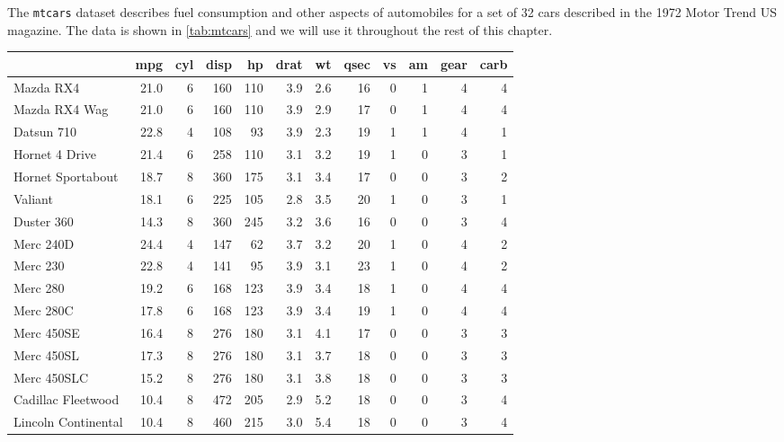 The {\tt mtcars} dataset describes fuel consumption and other aspects of automobiles for a set of 32 cars described in the 1972 Motor Trend US magazine.  The data is shown in \ref{tab:mtcars} and we will use it throughout the rest of this chapter.

\begin{table}[ht]
\begin{center}
\begin{tabular}{l|rrrrrrrrrrr}
\hline
 & mpg & cyl & disp & hp & drat & wt & qsec & vs & am & gear & carb \\
\hline
Mazda RX4 & 21.0 & 6 & 160 & 110 & 3.9 & 2.6 & 16 & 0 & 1 & 4 & 4 \\
Mazda RX4 Wag & 21.0 & 6 & 160 & 110 & 3.9 & 2.9 & 17 & 0 & 1 & 4 & 4 \\
Datsun 710 & 22.8 & 4 & 108 & 93 & 3.9 & 2.3 & 19 & 1 & 1 & 4 & 1 \\
Hornet 4 Drive & 21.4 & 6 & 258 & 110 & 3.1 & 3.2 & 19 & 1 & 0 & 3 & 1 \\
Hornet Sportabout & 18.7 & 8 & 360 & 175 & 3.1 & 3.4 & 17 & 0 & 0 & 3 & 2 \\
Valiant & 18.1 & 6 & 225 & 105 & 2.8 & 3.5 & 20 & 1 & 0 & 3 & 1 \\
Duster 360 & 14.3 & 8 & 360 & 245 & 3.2 & 3.6 & 16 & 0 & 0 & 3 & 4 \\
Merc 240D & 24.4 & 4 & 147 & 62 & 3.7 & 3.2 & 20 & 1 & 0 & 4 & 2 \\
Merc 230 & 22.8 & 4 & 141 & 95 & 3.9 & 3.1 & 23 & 1 & 0 & 4 & 2 \\
Merc 280 & 19.2 & 6 & 168 & 123 & 3.9 & 3.4 & 18 & 1 & 0 & 4 & 4 \\
Merc 280C & 17.8 & 6 & 168 & 123 & 3.9 & 3.4 & 19 & 1 & 0 & 4 & 4 \\
Merc 450SE & 16.4 & 8 & 276 & 180 & 3.1 & 4.1 & 17 & 0 & 0 & 3 & 3 \\
Merc 450SL & 17.3 & 8 & 276 & 180 & 3.1 & 3.7 & 18 & 0 & 0 & 3 & 3 \\
Merc 450SLC & 15.2 & 8 & 276 & 180 & 3.1 & 3.8 & 18 & 0 & 0 & 3 & 3 \\
Cadillac Fleetwood & 10.4 & 8 & 472 & 205 & 2.9 & 5.2 & 18 & 0 & 0 & 3 & 4 \\
Lincoln Continental & 10.4 & 8 & 460 & 215 & 3.0 & 5.4 & 18 & 0 & 0 & 3 & 4 \\

\end{tabular}
\end{center}
\end{table}
